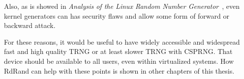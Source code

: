 \par{
Also, as is showed in {\em Analysis of the Linux Random Number Generator}~\cite{AnalysisOfLinuxRNG}, 
even kernel generators can has security flaws and allow some form 
of forward or backward attack. 
}

\par{
For these reasons, it would be useful to have widely accessible and widespread
 fast and high quality TRNG or at least slower TRNG with CSPRNG. 
 That device should be available to all users, even within virtualized systems. 
 How RdRand can help with these points is shown in other chapters 
 of this thesis.
}
